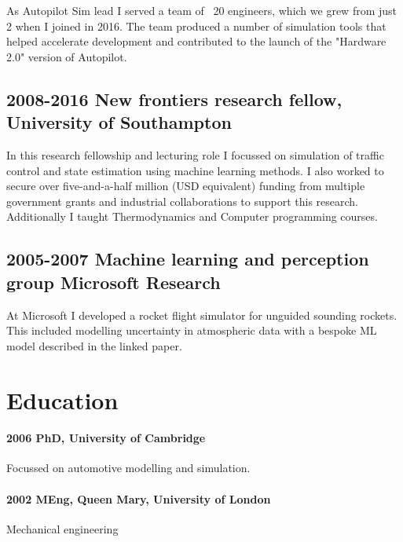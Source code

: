 As Autopilot Sim lead I served a team of ~20 engineers, which we grew from just 2 when I joined in 2016. The team produced a number of simulation tools that helped accelerate development and contributed to the launch of the "Hardware 2.0" version of Autopilot.

\subsection{2008-2016 New frontiers research fellow, University of Southampton}


In this research fellowship and lecturing role I focussed on simulation of traffic control and state estimation using machine learning methods. I also worked to secure over five-and-a-half million (USD equivalent) funding from multiple government grants and industrial collaborations to support this research. Additionally I taught Thermodynamics and Computer programming courses.

\subsection{2005-2007 Machine learning and perception group Microsoft Research}

At Microsoft I developed a rocket flight simulator for unguided sounding rockets. This included modelling uncertainty in atmospheric data with a bespoke ML model described in the linked paper.

\section{Education}
\paragraph{2006 PhD, University of Cambridge}
Focussed on automotive modelling and simulation.
\paragraph{2002 MEng, Queen Mary, University of London}
Mechanical engineering
